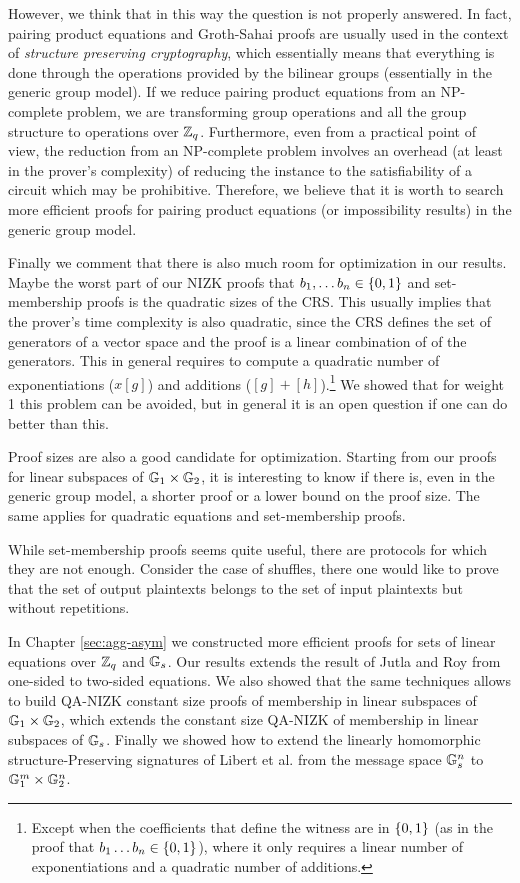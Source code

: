 However, we think that in this way the question is not properly answered. In fact, pairing product equations and Groth-Sahai proofs are usually used in the context of \emph{structure preserving cryptography}, which essentially  means that everything is done through the operations provided by the bilinear groups (essentially in the generic group model). If we reduce pairing product equations from an NP-complete problem, we are transforming group operations and all the group structure to operations over $\mathbb{Z}_q$. Furthermore, even from a practical point of view, the reduction from an NP-complete problem involves an overhead (at least in the prover's complexity) of reducing the instance to the satisfiability of a circuit which may be prohibitive. Therefore, we believe that it is worth to search more efficient proofs for pairing product equations (or impossibility results) in the generic group model.

Finally we comment that there is also much room for optimization in our results. Maybe the worst part of our NIZK proofs that $b_1,\ldots b_n\in\{0,1\}$ and set-membership proofs is the quadratic sizes of the CRS. This usually implies that the prover's time complexity is also quadratic, since the CRS defines the set of generators of a vector space and the proof is a linear combination of of the generators. This in general requires to compute a quadratic number of exponentiations ($x[g]$)  and additions ($[g]+[h]$).\footnote{Except when the coefficients that define the witness are in $\{0,1\}$ (as in the proof that $b_1\ldots b_n\in\{0,1\}$), where it only requires a linear number of exponentiations and a quadratic number of additions.} We showed that for weight 1 this problem can be avoided, but in general it is an open question if one can do better than this.

Proof sizes are also a good candidate for optimization. Starting from our proofs for linear subspaces of $\mathbb{G}_1\times\mathbb{G}_2$, it is interesting to know if there is, even in the generic group model, a shorter proof or a lower bound on the proof size. The same applies for quadratic equations and set-membership proofs.

\iffalse
While set-membership proofs seems quite useful, there are protocols for which they are not enough. Consider the case of shuffles, there one would like to prove that the set of output plaintexts belongs to the set of input plaintexts but without repetitions. 


In Chapter \ref{sec:agg-asym} we constructed more efficient proofs for sets of linear equations over $\mathbb{Z}_q$ and $\mathbb{G}_s$. Our results extends the result of Jutla and Roy \cite{C:JutRoy14} from one-sided to two-sided equations. We also showed that the same techniques allows to build QA-NIZK constant size proofs of membership in linear subspaces of $\mathbb{G}_1\times\mathbb{G}_2$, which extends the constant size QA-NIZK of membership in linear subspaces of $\mathbb{G}_s$. Finally we showed how to extend the linearly homomorphic structure-Preserving signatures of Libert et al. \cite{EC:LPJY14} from the message space $\mathbb{G}_s^n$ to $\mathbb{G}_1^m\times\mathbb{G}_2^n$.

